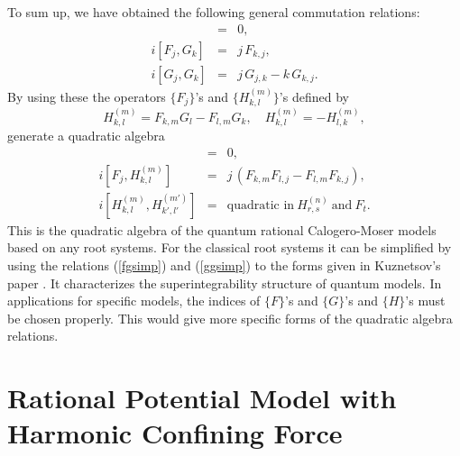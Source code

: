 \documentclass[a4paper,12pt]{article}
\begin{document}
\bigskip
To sum up, we have obtained the following general commutation
relations:
\begin{eqnarray}
[F_j,F_k]&=&0,\\
i[F_j,G_k]&=&j\,F_{k,j},\label{fgf}\\
i[G_j,G_k]&=&j\,G_{j,k}-k\,G_{k,j}.
\end{eqnarray}
By using these the operators $\{F_j\}$'s and $\{H_{k,l}^{(m)}\}$'s defined
by
\begin{equation}
H_{k,l}^{(m)}=F_{k,m}G_{l}-F_{l,m}G_{k},\quad
H_{k,l}^{(m)}=-H_{l,k}^{(m)},
\label{defhkls}
\end{equation}
generate a quadratic algebra
\begin{eqnarray}
[F_j,F_k]&=&0,\\
i[F_j,H_{k,l}^{(m)}]&=&j\,(F_{k,m}F_{l,j}-F_{l,m}F_{k,j}),\\
i[H_{k,l}^{(m)},H_{k',l'}^{(m')}]&=&\mbox{quadratic in}\ H_{r,s}^{(n)}\
\mbox{and}\ F_t.
\label{hhcom}
\end{eqnarray}
This is the quadratic algebra of the quantum rational Calogero-Moser models
based on any root systems. For the classical root systems it can
be simplified by using the relations (\ref{fgsimp}) and (\ref{ggsimp})
to the forms given in Kuznetsov's paper \cite{Kuz}.
It characterizes the superintegrability structure of quantum models.
In  applications for specific models, the indices of $\{F\}$'s and $\{G\}$'s
and $\{H\}$'s must be chosen properly. This would give more specific forms
of the quadratic algebra relations.


\section{Rational Potential Model with Harmonic Confining Force}
\label{harm}
\setcounter{equation}{0}
\end{document}
